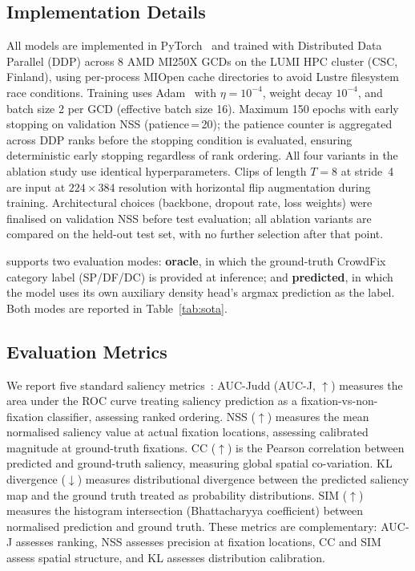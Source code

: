 \documentclass[twocolumn]{article}
\begin{document}
\subsection{Implementation Details}

All models are implemented in PyTorch~\citep{pytorch} and trained with
Distributed Data Parallel (DDP) across 8 AMD MI250X GCDs on the LUMI
HPC cluster (CSC, Finland), using per-process MIOpen cache directories to
avoid Lustre filesystem race conditions.  Training uses Adam~\citep{adam}
with $\eta\!=\!10^{-4}$, weight decay $10^{-4}$, and batch size 2 per GCD
(effective batch size 16).  Maximum 150 epochs with early stopping on
validation NSS (patience\,=\,20); the patience counter is aggregated
across DDP ranks before the stopping condition is evaluated, ensuring
deterministic early stopping regardless of rank ordering.  All four variants
in the ablation study use identical hyperparameters.  Clips of length
$T\!=\!8$ at stride~4 are input at $224\!\times\!384$ resolution with
horizontal flip augmentation during training.  Architectural choices
(backbone, dropout rate, loss weights) were finalised on validation NSS
before test evaluation; all ablation variants are compared on the
held-out test set, with no further selection after that point.

\ourmodel{} supports two evaluation modes: \textbf{oracle}, in which
the ground-truth CrowdFix category label (SP/DF/DC) is provided at
inference; and \textbf{predicted}, in which the model uses its own
auxiliary density head's argmax prediction as the label.  Both modes
are reported in Table~\ref{tab:sota}.

\subsection{Evaluation Metrics}

We report five standard saliency metrics~\citep{mit_benchmark}:
AUC-Judd (AUC-J, $\uparrow$) measures the area under the ROC curve
treating saliency prediction as a fixation-vs-non-fixation classifier,
assessing ranked ordering.  NSS ($\uparrow$) measures the mean normalised
saliency value at actual fixation locations, assessing calibrated magnitude
at ground-truth fixations.  CC ($\uparrow$) is the Pearson correlation
between predicted and ground-truth saliency, measuring global spatial
co-variation.  KL divergence ($\downarrow$) measures distributional
divergence between the predicted saliency map and the ground truth treated
as probability distributions.  SIM ($\uparrow$) measures the histogram
intersection (Bhattacharyya coefficient) between normalised prediction
and ground truth.  These metrics are complementary: AUC-J assesses ranking,
NSS assesses precision at fixation locations, CC and SIM assess spatial
structure, and KL assesses distribution calibration.
\end{document}
